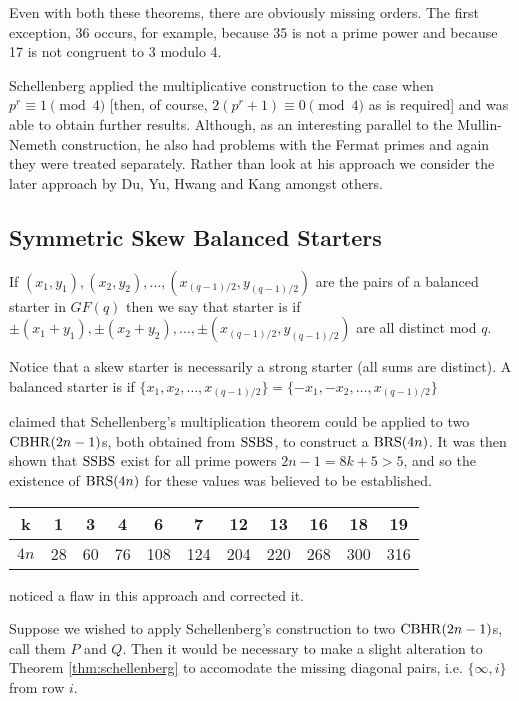 Even with both these theorems, there are obviously missing orders.
The first exception, 36 occurs, for example, because 35 is not a prime power and because 17 is not congruent to 3 modulo 4.

Schellenberg applied the multiplicative construction to the case when $p^r \equiv 1\pmod 4$ [then, of course, $2(p^r + 1) \equiv 0\pmod 4$ as is required] and was able to obtain further results.
Although, as an interesting parallel to the Mullin-Nemeth construction, he also had problems with the Fermat primes and again they were treated separately.
Rather than look at his approach we consider the later approach by Du, Yu, Hwang and Kang amongst others.

\subsection{Symmetric Skew Balanced Starters}

If $(x_1, y_1), (x_2, y_2),\ldots, (x_{(q - 1)/2}, y_{(q - 1)/2})$ are the pairs of a balanced starter in $GF(q)$ then we say that starter is  if $\pm(x_1 + y_1), \pm(x_2 + y_2),\ldots, \pm(x_{(q - 1)/2}, y_{(q - 1)/2})$ are all distinct mod $q$.

Notice that a skew starter is necessarily a strong starter (all sums are distinct).
A balanced starter is  if $\{x_1, x_2,\ldots, x_{(q - 1)/2}\} = \{-x_1, -x_2,\ldots, x_{(q - 1)/2}\}$

\cite{hwangCompleteBalancedHowell1984} claimed that Schellenberg’s multiplication theorem could be applied to two $\operatorname{CBHR}(2n - 1)$s, both obtained from $\operatorname{SSBS}$, to construct a $\operatorname{BRS}(4n)$.
It was then shown that $\operatorname{SSBS}$ exist for all prime powers $2n - 1 = 8k + 5 > 5$, and so the existence of $\operatorname{BRS}(4n)$ for these values was believed to be established.

\begin{center}
\begin{tabular}{|c|c|c|c|c|c|c|c|c|c|c|}
\hline
  k  &  1 &  3 &  4 &   6 &   7 &  12 &  13 &  16 &  18 & 19 \\ \hline
$4n$ & 28 & 60 & 76 & 108 & 124 & 204 & 220 & 268 & 300 & 316 \\ \hline
\end{tabular}
\end{center}

\cite{andersonConstructionBalancedRoom1999} noticed a flaw in this approach and corrected it.

Suppose we wished to apply Schellenberg’s construction to two $\operatorname{CBHR}(2n - 1)$s, call them $P$ and $Q$.
Then it would be necessary to make a slight alteration to Theorem \ref{thm:schellenberg} to accomodate the missing diagonal pairs, i.e. $\{\infty, i\}$ from row $i$.

